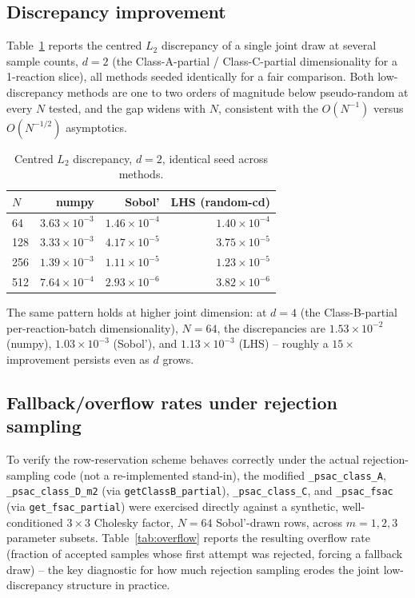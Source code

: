 \documentclass[11pt]{article}
\newcommand{\code}[1]{\texttt{#1}}
\begin{document}
\subsection{Discrepancy improvement}

Table~\ref{tab:discrepancy} reports the centred $L_2$ discrepancy of a single joint draw at several sample counts, $d=2$ (the Class-A-partial / Class-C-partial dimensionality for a 1-reaction slice), all methods seeded identically for a fair comparison. Both low-discrepancy methods are one to two orders of magnitude below pseudo-random at every $N$ tested, and the gap widens with $N$, consistent with the $O(N^{-1})$ versus $O(N^{-1/2})$ asymptotics.

\begin{table}[h]
\centering
\caption{Centred $L_2$ discrepancy, $d=2$, identical seed across methods.}
\label{tab:discrepancy}
\begin{tabular}{@{}lrrr@{}}
\toprule
$N$ & numpy & Sobol' & LHS (random-cd) \\
\midrule
64  & $3.63\times10^{-3}$ & $1.46\times10^{-4}$ & $1.40\times10^{-4}$ \\
128 & $3.33\times10^{-3}$ & $4.17\times10^{-5}$ & $3.75\times10^{-5}$ \\
256 & $1.39\times10^{-3}$ & $1.11\times10^{-5}$ & $1.23\times10^{-5}$ \\
512 & $7.64\times10^{-4}$ & $2.93\times10^{-6}$ & $3.82\times10^{-6}$ \\
\bottomrule
\end{tabular}
\end{table}

The same pattern holds at higher joint dimension: at $d=4$ (the Class-B-partial per-reaction-batch dimensionality), $N=64$, the discrepancies are $1.53\times10^{-2}$ (numpy), $1.03\times10^{-3}$ (Sobol'), and $1.13\times10^{-3}$ (LHS) -- roughly a $15\times$ improvement persists even as $d$ grows.

\subsection{Fallback/overflow rates under rejection sampling}

To verify the row-reservation scheme behaves correctly under the actual rejection-sampling code (not a re-implemented stand-in), the modified \code{\_psac\_class\_A}, \code{\_psac\_class\_D\_m2} (via \code{getClassB\_partial}), \code{\_psac\_class\_C}, and \code{\_psac\_fsac} (via \code{get\_fsac\_partial}) were exercised directly against a synthetic, well-conditioned $3\times3$ Cholesky factor, $N{=}64$ Sobol'-drawn rows, across $m=1,2,3$ parameter subsets. Table~\ref{tab:overflow} reports the resulting overflow rate (fraction of accepted samples whose first attempt was rejected, forcing a fallback draw) -- the key diagnostic for how much rejection sampling erodes the joint low-discrepancy structure in practice.
\end{document}
